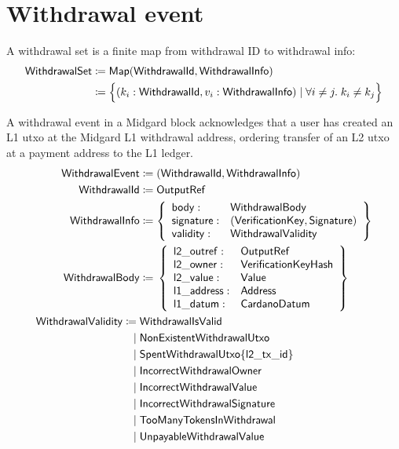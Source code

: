 \documentclass[../midgard.tex]{subfiles}
\begin{document}
\section{Withdrawal event}
\label{h:withdrawal-event}

A withdrawal set is a finite map from withdrawal ID to withdrawal info:
\begin{align*}
    \mathsf{WithdrawalSet} &\coloneq \mathsf{Map(WithdrawalId, WithdrawalInfo)} \\
      &\coloneq \Bigl\{
        (k_i: \mathsf{WithdrawalId}, v_i: \mathsf{WithdrawalInfo}) \mid \forall i \neq j.\; k_i \neq k_j
    \Bigr\}
\end{align*}

A withdrawal event in a Midgard block acknowledges that a user has created an L1 utxo at the Midgard L1 withdrawal address, ordering transfer of an L2 utxo at a payment address to the L1 ledger.
\begingroup
\allowdisplaybreaks{}
\begin{align*}
    \mathsf{WithdrawalEvent} &\coloneq \mathsf{(WithdrawalId, WithdrawalInfo)} \\
    \mathsf{WithdrawalId} &\coloneq \mathsf{OutputRef} \\
    \mathsf{WithdrawalInfo} &\coloneq \left\{
        \begin{array}{ll}
            \mathsf{body} :& \mathsf{WithdrawalBody} \\
            \mathsf{signature} :& \mathsf{(VerificationKey, Signature)} \\
            \mathsf{validity} :& \mathsf{WithdrawalValidity} \\
        \end{array} \right\}\\
    \mathsf{WithdrawalBody} &\coloneq{} \left\{
        \begin{array}{ll}
            \mathsf{l2\_outref} :& \mathsf{OutputRef} \\
            \mathsf{l2\_owner} :& \mathsf{VerificationKeyHash} \\
            \mathsf{l2\_value} :& \mathsf{Value} \\
            \mathsf{l1\_address} : & \mathsf{Address} \\
            \mathsf{l1\_datum} : & \mathsf{CardanoDatum}
        \end{array} \right\}\\
    \mathsf{WithdrawalValidity} \coloneq\;& \mathsf{WithdrawalIsValid} \\
	                               \mid\;& \mathsf{NonExistentWithdrawalUtxo} \\
	                               \mid\;& \mathsf{SpentWithdrawalUtxo}\{\mathsf{l2\_tx\_id}\} \\
	                               \mid\;& \mathsf{IncorrectWithdrawalOwner} \\
	                               \mid\;& \mathsf{IncorrectWithdrawalValue} \\
	                               \mid\;& \mathsf{IncorrectWithdrawalSignature} \\
	                               \mid\;& \mathsf{TooManyTokensInWithdrawal} \\
	                               \mid\;& \mathsf{UnpayableWithdrawalValue}
\end{align*}
\endgroup
\end{document}
